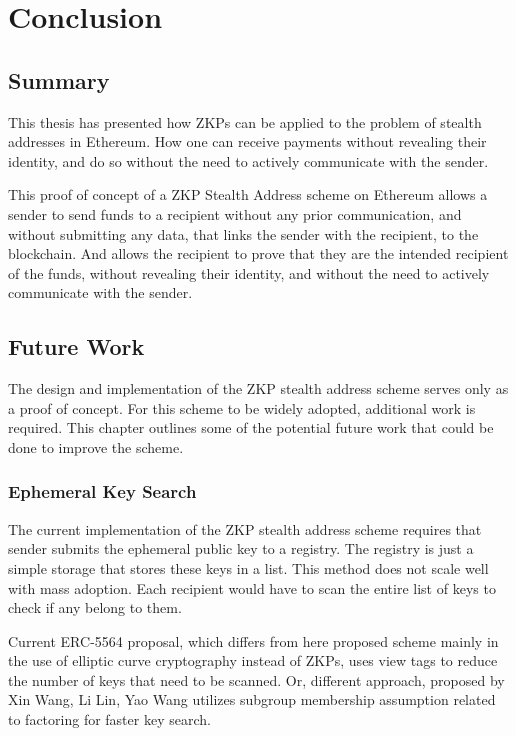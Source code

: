 \chapter{Conclusion}\label{chapter:conclusion}

\section{Summary}

This thesis has presented how ZKPs can be applied to the problem of stealth
addresses in Ethereum. How one can receive payments without revealing their
identity, and do so without the need to actively communicate with the sender.

This proof of concept of a ZKP Stealth Address scheme on Ethereum allows
a sender to send funds to a recipient without any prior communication, and
without submitting any data, that links the sender with the recipient, to the blockchain.
And allows the recipient to prove that they are the intended recipient of the
funds, without revealing their identity, and without the need to actively
communicate with the sender.


\section{Future Work}

The design and implementation of the ZKP stealth address scheme serves only as
a proof of concept. For this scheme to be widely adopted, additional work is
required. This chapter outlines some of the potential future work that could be
done to improve the scheme.

\subsection*{Ephemeral Key Search}

The current implementation of the ZKP stealth address scheme requires that sender
submits the ephemeral public key to a registry. The registry is just a simple
storage that stores these keys in a list. This method does not scale well with
mass adoption. Each recipient would have to scan the entire list of keys to
check if any belong to them.

Current ERC-5564\cite{ethereumERC5564Stealth} proposal, which differs from
here proposed scheme mainly in the use of elliptic curve cryptography instead
of ZKPs, uses view tags to reduce the number of keys that need to be scanned.
Or, different approach, proposed by Xin Wang, Li Lin, Yao Wang \cite{Wang2023}
utilizes subgroup membership assumption related to factoring for faster key
search.

